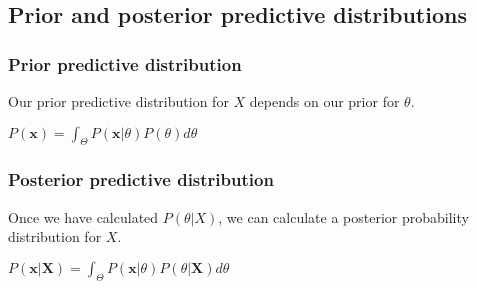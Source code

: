 
\subsection{Prior and posterior predictive distributions}

\subsubsection{Prior predictive distribution}

Our prior predictive distribution for \(X\) depends on our prior for \(\theta \).

\(P(\mathbf x)=\int_\Theta P(\mathbf x|\theta)P(\theta )d\theta \)

\subsubsection{Posterior predictive distribution}

Once we have calculated \(P(\theta |X)\), we can calculate a posterior probability distribution for \(X\).

\(P(\mathbf x|\mathbf X)=\int_\Theta P(\mathbf x|\theta)P(\theta |\mathbf X)d\theta \)

